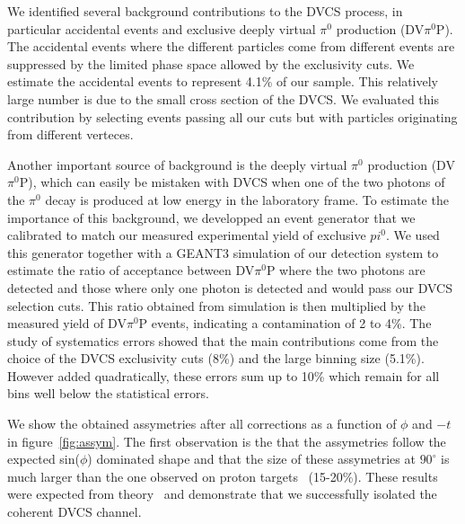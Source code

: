 \documentclass[%
 reprint,
 amsmath,amssymb,
 aps,
]{revtex4-1}
\begin{document}
We identified several background contributions to the DVCS process, in 
particular accidental events and exclusive deeply virtual 
$\pi^0$ production (DV$\pi^0$P). The accidental
events where the different particles come from different events are 
suppressed by the limited phase space allowed by the exclusivity cuts. We 
estimate the accidental events to represent 4.1\% of our sample. This relatively 
large number is due to the small cross section of the DVCS. We evaluated this contribution by
selecting events passing all our cuts but with particles originating from 
different verteces. 

Another important source of background is the deeply virtual 
$\pi^0$ production (DV$\pi^0$P), which can easily be mistaken
with DVCS when one of the two photons of the $\pi^0$ decay is produced at
low energy in the laboratory frame. To estimate the importance of
this background, we developped an event generator 
that we calibrated to match our measured experimental yield of exclusive 
$pi^0$. We used this generator together 
with a GEANT3 simulation of our detection system to estimate the ratio 
of acceptance between DV$\pi^0$P where the two photons are detected and those
where only one photon is detected and would pass our 
DVCS selection cuts. This ratio obtained from simulation is then multiplied by 
the measured yield of DV$\pi^0$P events, indicating a contamination of 2 to 4\%. 
The study of systematics errors showed that the main contributions come from 
the choice of the DVCS exclusivity cuts (8\%) and the large binning size 
(5.1\%). However added quadratically, these errors sum up to 10\% which remain 
for all bins well below the statistical errors.


We show the obtained assymetries after all corrections as a function of 
$\phi$ and $-t$ in figure~\ref{fig:assym}. The first observation is the
that the assymetries follow the expected sin($\phi$) dominated shape
and that the size of these assymetries at $90^\circ$ is much larger than the one
observed on proton targets~\cite{} (15-20\%). These results were expected from 
theory~\cite{} and demonstrate that we successfully isolated the coherent
DVCS channel.
\end{document}
